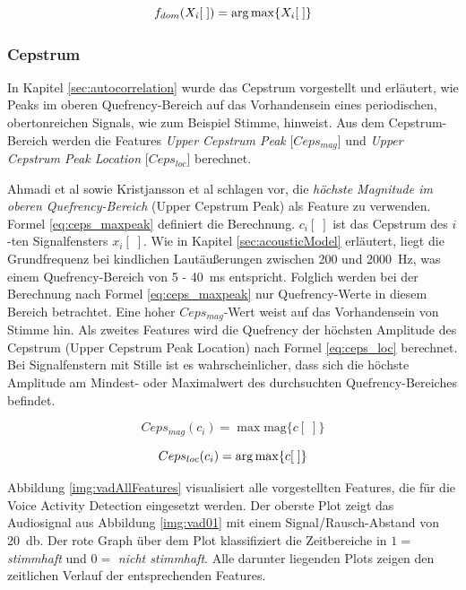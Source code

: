 \begin{equation}
f_{dom}(X_i[\;]) = \operatorname*{arg\,max} \{X_i[\;]\}
\label{eq:domfreq}
\end{equation}


\subsubsection{Cepstrum}
\label{sec:cepstrum-feature}

In Kapitel \ref{sec:autocorrelation} wurde das Cepstrum vorgestellt und erläutert, wie Peaks im oberen Quefrency-Bereich auf das Vorhandensein eines periodischen, obertonreichen Signals, wie zum Beispiel Stimme, hinweist. Aus dem Cepstrum-Bereich werden die Features \emph{Upper Cepstrum Peak} [$Ceps_{mag}$] und \emph{Upper Cepstrum Peak Location} [$Ceps_{loc}$] berechnet.

Ahmadi et al \cite{vad_ceps} sowie Kristjansson et al\cite{vad_Lisboa} schlagen vor, die \emph{höchste Magnitude im oberen Quefrency-Bereich} (Upper Cepstrum Peak) als Feature zu verwenden. Formel \ref{eq:ceps_maxpeak} definiert die Berechnung. $c_i[\;]$ ist das Cepstrum des $i$-ten Signalfensters $x_i[\;]$. Wie in Kapitel \ref{sec:acousticModel} erläutert, liegt die Grundfrequenz bei kindlichen Lautäußerungen zwischen 200 und \SI{2000}{\hertz}, was einem Quefrency-Bereich von 5 - \SI{40}{\milli\second} entspricht. Folglich werden bei der Berechnung nach Formel \ref{eq:ceps_maxpeak} nur Quefrency-Werte in diesem Bereich betrachtet. Eine hoher $Ceps_{mag}$-Wert weist auf das Vorhandensein von Stimme hin. Als zweites Features wird die Quefrency der höchsten Amplitude des Cepstrum (Upper Cepstrum Peak Location) nach Formel \ref{eq:ceps_loc} berechnet. Bei Signalfenstern mit Stille ist es wahrscheinlicher, dass sich die höchste Amplitude am Mindest- oder Maximalwert des durchsuchten Quefrency-Bereiches befindet.

\begin{equation}
Ceps_{mag}(c_i) = \max\text{mag}\{c[\;]\}
\label{eq:ceps_maxpeak}
\end{equation}

\begin{equation}
Ceps_{loc}(c_i) = \operatorname*{arg\,max} \{c[\;]\}
\label{eq:ceps_loc}
\end{equation}

Abbildung \ref{img:vadAllFeatures} visualisiert alle vorgestellten Features, die für die Voice Activity Detection eingesetzt werden. Der oberste Plot zeigt das Audiosignal aus Abbildung \ref{img:vad01} mit einem Signal/Rausch-Abstand von \SI{20}{\decibel}. Der rote Graph über dem Plot klassifiziert die Zeitbereiche in $1 = $ \emph{stimmhaft} und $0 = $ \emph{nicht stimmhaft}. Alle darunter liegenden Plots zeigen den zeitlichen Verlauf der entsprechenden Features.

